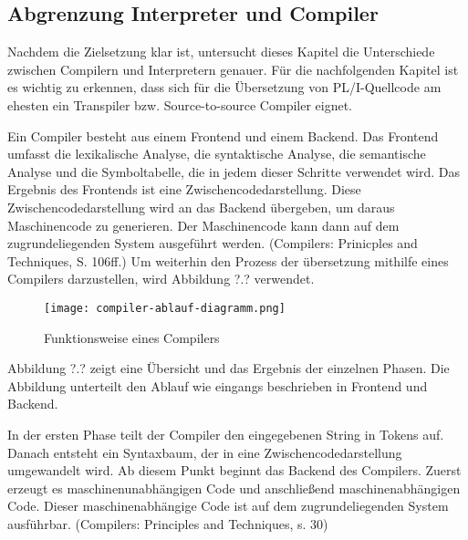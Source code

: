 %
	
 
    \pagebreak

\subsection{Abgrenzung Interpreter und Compiler}
Nachdem die Zielsetzung klar ist, untersucht dieses Kapitel die Unterschiede zwischen Compilern und Interpretern genauer. Für die nachfolgenden Kapitel ist es wichtig zu erkennen, dass sich für die Übersetzung von PL/I-Quellcode am ehesten ein Transpiler bzw. Source-to-source Compiler eignet.
  
Ein Compiler besteht aus einem Frontend und einem Backend. Das Frontend umfasst die lexikalische Analyse, die syntaktische Analyse, die semantische Analyse und die Symboltabelle, die in jedem dieser Schritte verwendet wird. 
Das Ergebnis des Frontends ist eine Zwischencodedarstellung. Diese Zwischencodedarstellung wird an das Backend übergeben, um daraus Maschinencode zu generieren. Der Maschinencode kann dann auf dem zugrundeliegenden System ausgeführt werden. (Compilers: Prinicples and Techniques, S. 106ff.)
Um weiterhin den Prozess der übersetzung mithilfe eines Compilers darzustellen, wird Abbildung ?.? verwendet.

\pagebreak
\begin{figure}[h]
  \centering
  \caption{Funktionsweise eines Compilers}
  \texttt{[image: compiler-ablauf-diagramm.png]}
  \label{fig:compiler}
\end{figure}
\pagebreak
Abbildung ?.? zeigt eine Übersicht und das Ergebnis der einzelnen Phasen. Die Abbildung unterteilt den Ablauf wie eingangs beschrieben in Frontend und Backend.

In der ersten Phase teilt der Compiler den eingegebenen String in Tokens auf. Danach entsteht ein Syntaxbaum, der in eine Zwischencodedarstellung umgewandelt wird. Ab diesem Punkt beginnt das Backend des Compilers. Zuerst erzeugt es maschinenunabhängigen Code und anschließend maschinenabhängigen Code. Dieser maschinenabhängige Code ist auf dem zugrundeliegenden System ausführbar. (Compilers: Principles and Techniques, s. 30) 

